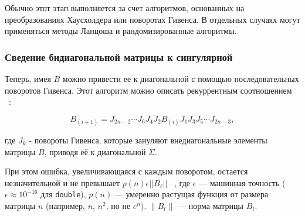 \documentclass[12pt, a4paper]{report}
\theoremstyle{note}
\begin{document}
Обычно этот этап выполняется за счет алгоритмов, основанных на преобразованиях Хаусхолдера или поворотах Гивенса. В отдельных случаях могут применяться методы Ланцоша и рандомизированные алгоритмы. 

\subsubsection{Сведение бидиагональной матрицы к сингулярной}

Теперь, имея $B$ можно привести ее к диагональной с помощью последовательных поворотов Гивенса. Этот алгоритм можно описать рекуррентным соотношением ~\cite{Demmel1990}:

\begin{equation}
B_{(i+1)} = J_{2n-2} \cdots J_6 J_4 J_2 B_{(i)} J_1 J_3 J_5 \cdots J_{2n-3},
\end{equation}

где \( J_k \) - повороты Гивенса, которые зануляют внедиагональные элементы матрицы \( B \), приводя её к диагональной \( \Sigma \). 

При этом ошибка, увеличивающаяся с каждым поворотом, остается незначительной и не превышает $p(n) \epsilon ||B_\ell||$ ~\cite{Demmel1990}, где  \( \epsilon \) — машинная точность (\( \epsilon \approx 10^{-16} \) для \texttt{double}), \( p(n) \) — умеренно растущая функция от размера матрицы \( n \) (например, \( n \), \( n^2 \), но не \( e^n \)). \( \|B_t\| \) — норма матрицы \( B_t \).
\end{document}
